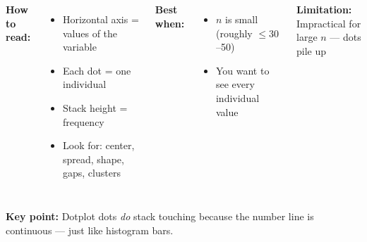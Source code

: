 \documentclass[aspectratio=169, 11pt]{beamer}
\begin{document}
{
\begin{frame}[t, plain]
  \hspace{0.55cm}%
  \begin{minipage}{0.9\textwidth}
    \vspace{0.2em}
    \begin{columns}[t]
        \small
        \textbf{\color{navy}How to read:}
        \begin{itemize}\setlength{\itemsep}{0.4em}
          \item Horizontal axis = values of the variable
          \item Each dot = one individual
          \item Stack height = frequency
          \item Look for: center, spread, shape, gaps, clusters
        \end{itemize}

        \small
        \textbf{\color{navy}Best when:}
        \begin{itemize}\setlength{\itemsep}{0.4em}
          \item $n$ is small (roughly $\le 30$--50)
          \item You want to see every individual value
        \end{itemize}

        \vspace{0.3cm}
        \textbf{\color{navy}Limitation:}\\
        Impractical for large $n$ --- dots pile up
    \end{columns}

    \vspace{0.5cm}
    {\color{navy}\bfseries\small Key point:}
    Dotplot dots \textit{do} stack touching because the number line is continuous
    --- just like histogram bars.
  \end{minipage}
\end{frame}
}
\end{document}
